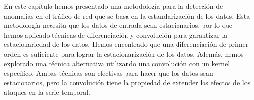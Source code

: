 En este capítulo hemos presentado una metodología para la detección de anomalías en el tráfico de red que se basa en la estandarización de los datos. Esta metodología necesita que los datos de entrada sean estacionarios, por lo que hemos aplicado técnicas de diferenciación y convolución para garantizar la estacionariedad de los datos. Hemos encontrado que una diferenciación de primer orden es suficiente para lograr la estacionarización de los datos. Además, hemos explorado una técnica alternativa utilizando una convolución con un kernel específico. Ambas técnicas son efectivas para hacer que los datos sean estacionarios, pero la convolución tiene la propiedad de extender los efectos de los ataques en la serie temporal.